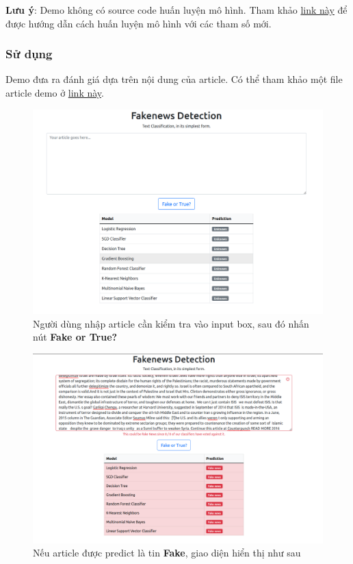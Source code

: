 \documentclass[12pt]{article}
\begin{document}
\textbf{Lưu ý}: Demo không có source code huấn luyện mô hình. Tham khảo \href{https://github.com/trhgquan/fakenews-detection#model}{link này} để được hướng dẫn cách huấn luyện mô hình với các tham số mới.

\subsubsection{Sử dụng}
Demo đưa ra đánh giá dựa trên nội dung của article. Có thể tham khảo một file article demo ở \href{https://github.com/trhgquan/fakenews-detection/blob/main/model/demo.txt}{link này}.


\begin{figure}[H]
\centering
\includegraphics[scale=.25]{img/homepage.png}
\caption{Người dùng nhập article cần kiểm tra vào input box, sau đó nhấn nút \textbf{Fake or True?}}
\label{fig:homepage}
\end{figure}

\begin{figure}[H]
\centering
\includegraphics[scale=.25]{img/fake-result.png}
\caption{Nếu article được predict là tin \textbf{Fake}, giao diện hiển thị như sau}
\label{fig:fake-result}
\end{figure}
\end{document}
